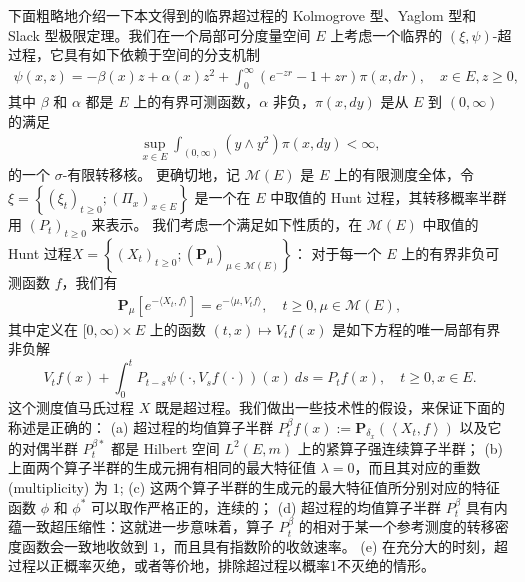 \documentclass[12pt,a4paper]{amsart}
\numberwithin{equation}{section}
\theoremstyle{plain}
\theoremstyle{definition}
\begin{document}
下面粗略地介绍一下本文得到的临界超过程的 Kolmogrove 型、Yaglom 型和 Slack 型极限定理。我们在一个局部可分度量空间 $E$ 上考虑一个临界的 $(\xi,\psi)$-超过程，它具有如下依赖于空间的分支机制
\begin{align}
\psi(x,z)
  = -\beta(x) z + \alpha(x) z^2 + \int_0^\infty \left( e^{-zr} - 1 + zr \right) \pi(x,dr),
\quad x\in E,z\geq 0,
\end{align}
其中 $\beta$ 和 $\alpha$ 都是 $E$ 上的有界可测函数，$\alpha$ 非负，$\pi(x,dy)$ 是从 $E$ 到 $(0,\infty)$ 的满足
\begin{align}
\sup_{x\in E} \int_{(0,\infty)} (y\wedge y^2) \pi(x,dy)< \infty,
\end{align}
的一个 $\sigma$-有限转移核。
更确切地，记 $\mathcal M(E)$ 是 $E$ 上的有限测度全体，令 $\xi =  \left\{ \left( \xi_t \right)_{t\geq 0};\left( \Pi_x \right)_{x\in E} \right\}$ 是一个在 $E$ 中取值的 Hunt 过程，其转移概率半群用 $(P_t)_{t\geq 0}$ 来表示。
我们考虑一个满足如下性质的，在 $\mathcal M(E)$ 中取值的 Hunt 过程$X = \left\{ \left( X_t \right)_{t\geq 0}; \left( \mathbf P_\mu \right)_{\mu \in \mathcal M(E)} \right\}$：
对于每一个 $E$ 上的有界非负可测函数 $f$，我们有
\begin{align}
\mathbf P_\mu [e^{- \langle X_t,f\rangle}] 
= e^{-\langle  \mu, V_t f \rangle},
\quad t\geq 0, \mu \in \mathcal M(E),
\end{align}
其中定义在 $[0,\infty)\times E$ 上的函数 $(t,x)\mapsto V_tf(x)$ 是如下方程的唯一局部有界非负解
\[
V_tf(x)+ \int_0^t P_{t-s}\psi \left(\cdot, V_sf(\cdot)\right)(x)~ds
= P_tf(x),
\quad t\geq 0, x\in E.
\]
这个测度值马氏过程 $X$ 既是超过程。我们做出一些技术性的假设，来保证下面的称述是正确的：
(a) 超过程的均值算子半群 $P_t^\beta f(x):= \mathbf P_{\delta_x}\left( \left\langle X_t,f \right\rangle \right)$ 以及它的对偶半群 $P^{\beta *}_t$ 都是 Hilbert 空间 $L^2(E,m)$ 上的紧算子强连续算子半群；
(b) 上面两个算子半群的生成元拥有相同的最大特征值 $\lambda = 0$，而且其对应的重数 (multiplicity) 为 $1$; 
(c) 这两个算子半群的生成元的最大特征值所分别对应的特征函数 $\phi$ 和 $\phi^*$ 可以取作严格正的，连续的；  
(d) 超过程的均值算子半群 $P_t^\beta$ 具有内蕴一致超压缩性：这就进一步意味着，算子 $P_t^\beta$ 的相对于某一个参考测度的转移密度函数会一致地收敛到 $1$，而且具有指数阶的收敛速率。
(e) 在充分大的时刻，超过程以正概率灭绝，或者等价地，排除超过程以概率1不灭绝的情形。
\end{document}

